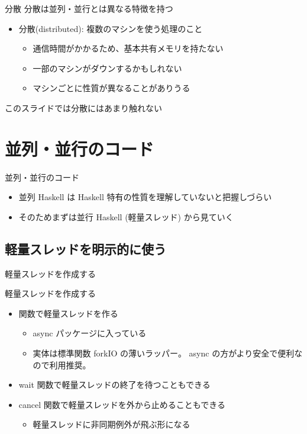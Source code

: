 \documentclass[unicode,12pt]{beamer}
\begin{document}
\begin{frame}{分散}
  分散は並列・並行とは異なる特徴を持つ
  \begin{itemize}
  \item 分散(distributed): 複数のマシンを使う処理のこと
    \begin{itemize}
    \item 通信時間がかかるため、基本共有メモリを持たない
    \item 一部のマシンがダウンするかもしれない
    \item マシンごとに性質が異なることがありうる
    \end{itemize}
  \end{itemize}
  このスライドでは分散にはあまり触れない
\end{frame}

\section{並列・並行のコード}

\begin{frame}{並列・並行のコード}
  \begin{itemize}
  \item 並列 Haskell は Haskell 特有の性質を理解していないと把握しづらい
  \item そのためまずは並行 Haskell (軽量スレッド) から見ていく
  \end{itemize}
\end{frame}

\subsection{軽量スレッドを明示的に使う}

\begin{frame}{軽量スレッドを作成する}
  
\end{frame}

\begin{frame}{軽量スレッドを作成する}
  \begin{itemize}
  \item \alert{} 関数で軽量スレッドを作る
    \begin{itemize}
    \item async パッケージに入っている
    \item 実体は標準関数 {\ttfamily forkIO} の薄いラッパー。
      {\ttfamily async} の方がより安全で便利なので利用推奨。
    \end{itemize}
    \item {\ttfamily wait} 関数で軽量スレッドの終了を待つこともできる
    \item {\ttfamily cancel} 関数で軽量スレッドを外から止めることもできる
      \begin{itemize}
      \item 軽量スレッドに非同期例外が飛ぶ形になる
      \end{itemize}
  \end{itemize}
\end{frame}
\end{document}
